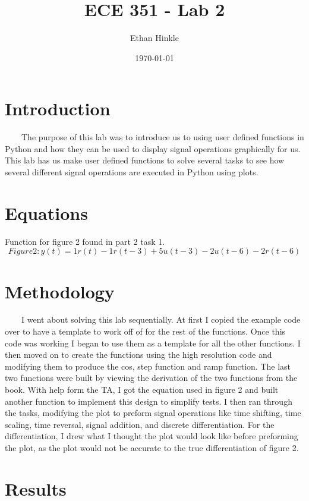 \documentclass[11pt,a4]{article}
\title{ECE 351 - Lab 2}
\author{Ethan Hinkle}
\date{\today}
\begin{document}
\maketitle

\section{Introduction}
\ \ \ \ The purpose of this lab was to introduce us to using user defined functions in Python and how they can be used to display signal operations graphically for us. This lab has us make user defined functions to solve several tasks to see how several different signal operations are executed in Python using plots.

\section{Equations}
Function for figure 2 found in part 2 task 1.\\
\begin{equation}
Figure 2: y(t) = 1r(t) - 1r(t-3) + 5u(t-3) - 2u(t-6) - 2r(t-6)
\end{equation}


\section{Methodology}
\ \ \ \ I went about solving this lab sequentially. At first I copied the example code over to have a template to work off of for the rest of the functions. Once this code was working I began to use them as a template for all the other functions. I then moved on to create the functions using the high resolution code and modifying them to produce the cos, step function and ramp function. The last two functions were built by viewing the derivation of the two functions from the book. With help form the TA, I got the equation used in figure 2 and built another function to implement this design to simplify tests. I then ran through the tasks, modifying the plot to preform signal operations like time shifting, time scaling, time reversal, signal addition, and discrete differentiation. For the differentiation, I drew what I thought the plot would look like before preforming the plot, as the plot would not be accurate to the true differentiation of figure 2.

\section{Results}
\end{document}
